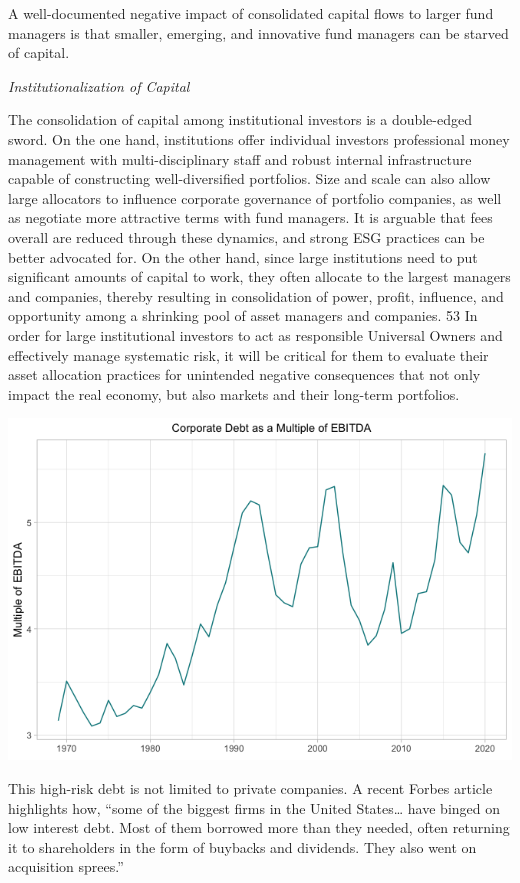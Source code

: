 \documentclass[
]{book}
\begin{document}
A well-documented negative impact of consolidated capital flows to larger
fund managers is that
smaller, emerging, and innovative fund managers can be starved of capital.

\emph{Institutionalization of Capital}

The consolidation of capital among institutional investors is a double-edged sword. On the one hand,
institutions offer individual investors professional money management with multi-disciplinary staff and
robust internal infrastructure capable of constructing well-diversified portfolios. Size and scale can also allow
large allocators to influence corporate governance of portfolio companies, as well as negotiate more
attractive terms with fund managers. It is arguable that fees overall are reduced through these dynamics, and
strong ESG practices can be better advocated for. On the other hand, since large institutions need to put
significant amounts of capital to work, they often allocate to the largest managers and companies, thereby
resulting in consolidation of power, profit, influence, and opportunity among a shrinking pool of asset
managers and companies. 53 In order for large institutional investors to act as responsible Universal Owners
and effectively manage systematic risk, it will be critical for them to evaluate their asset allocation practices
for unintended negative consequences that not only impact the real economy, but also markets and their
long-term portfolios.

\includegraphics{fig/corporate_debt_ebitda.png}

This high-risk debt is not limited to private companies. A recent Forbes article highlights how, ``some of
the biggest firms in the United States\ldots{} have binged on low interest debt. Most of them borrowed more
than they needed, often returning it to shareholders in the form of buybacks and dividends. They also
went on acquisition sprees.''
\end{document}
